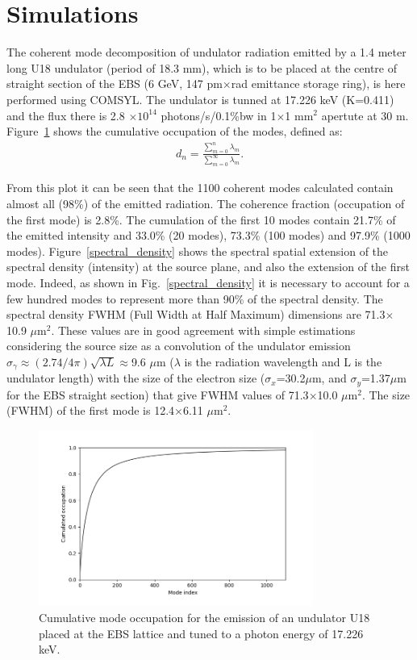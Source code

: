 \documentclass{iucr}              %
\begin{document}
\section{Simulations}

The coherent mode decomposition of undulator radiation emitted by a 1.4 meter long U18 undulator (period of 18.3 mm), which is to be placed at the centre of straight section of the EBS (6 GeV, 147 pm$\times$rad emittance storage ring), is here performed using COMSYL. The undulator is tunned at 17.226 keV (K=0.411) and the flux there is 2.8 $\times 10^{14}$ photons/s/0.1\%bw in 1$\times$1 mm$^2$ apertute at 30 m. Figure~\ref{cumulative_mode_occupation} shows the cumulative occupation of the modes, defined as: 
\begin{equation}
\begin{aligned}
\label{spectrum}
d_n=\frac{\sum_{m=0}^{n} \lambda_m}{\sum_{m=0}^{\infty} \lambda_m}.
\end{aligned}
\end{equation}

From this plot it can be seen that the 1100 coherent modes calculated contain almost all (98\%) of the emitted radiation. The coherence fraction (occupation of the first mode) is 2.8\%. The cumulation of the first 10 modes contain 21.7\% of the emitted intensity and 33.0\% (20 modes), 73.3\% (100 modes) and 97.9\% (1000 modes). 
Figure~\ref{spectral_density} shows the spectral spatial extension of the spectral density (intensity) at the source plane, and also the extension of the first mode.
Indeed, as shown in Fig.~\ref{spectral_density} it is necessary to account for a few hundred modes to represent more than 90\% of the spectral density. The spectral density FWHM (Full Width at Half Maximum) dimensions are 71.3$\times$10.9 $\mu$m$^2$. These values are in good agreement with simple estimations considering the source size as a convolution of the undulator emission $\sigma_\gamma\approx (2.74/4\pi) \sqrt{\lambda L}\approx$9.6 $\mu$m ($\lambda$ is the radiation wavelength and L is the undulator length) with the size of the electron size ($\sigma_x$=30.2$\mu$m, and $\sigma_y$=1.37$\mu$m for the EBS straight section) that give FWHM values of 71.3$\times$10.0 $\mu$m$^2$. The size (FWHM) of the first mode is 12.4$\times$6.11 $\mu$m$^2$.  

\begin{figure}\label{cumulative_mode_occupation}
\caption{Cumulative mode occupation for the emission of an undulator U18 placed at the EBS lattice and tuned to a photon energy of 17.226 keV.}
\includegraphics[width=9.0cm]{Figures/vx_cumulated.png}
\end{figure}
\end{document}

